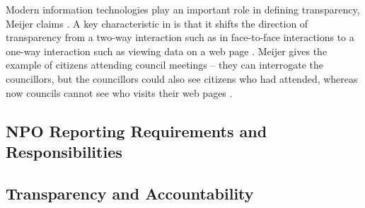 Modern information technologies play an important role in defining transparency, Meijer claims  \cite{meijer_understanding_2009}. A key characteristic in  is that it shifts the direction of transparency from a two-way interaction such as in face-to-face interactions to a one-way interaction such as viewing data on a web page \cite{meijer_understanding_2009}. Meijer gives the example of citizens attending council meetings -- they can interrogate the councillors, but the councillors could also see citizens who had attended, whereas now councils cannot see who visits their web pages \cite{meijer_understanding_2009}.

\subsection{NPO Reporting Requirements and Responsibilities}
\subsection{Transparency and Accountability}


